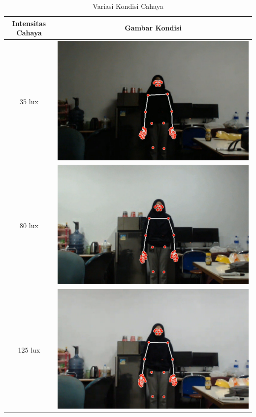 \newpage
\begin{longtable}{|c|c|}
  \caption{Variasi Kondisi Cahaya}
  \label{tb:kondisicahaya}                                   \\
  \hline
  \rowcolor[HTML]{C0C0C0}
  \textbf{Intensitas Cahaya} & \textbf{Gambar Kondisi}  \\
  \hline
  35 lux            &  \includegraphics[scale=0.3]{gambar/bab4-gelap.png}                \\
  \hline
  80 lux            & \includegraphics[scale=0.3]{gambar/bab4-remang.png}                 \\
  \hline
  125 lux            & \includegraphics[scale=0.3]{gambar/bab4-terang.png}                 \\
  \hline
\end{longtable}

